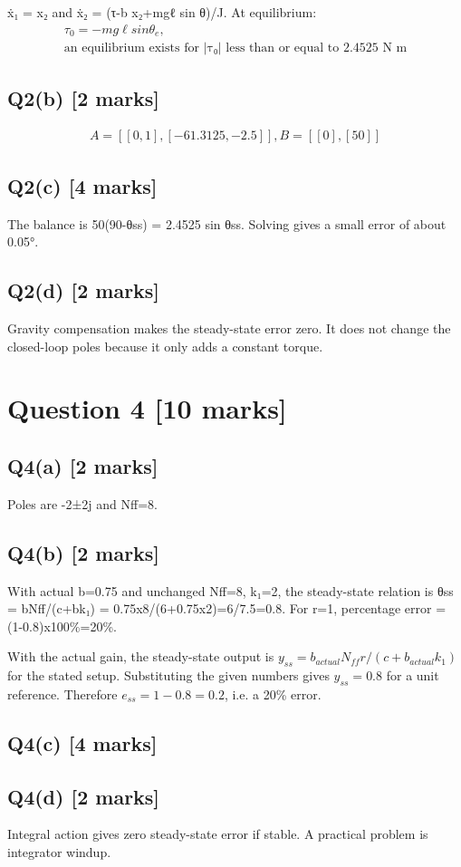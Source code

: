 \documentclass[11pt,a4paper]{article}
\begin{document}
ẋ₁ = x₂ and ẋ₂ = (τ-b x₂+mgℓ sin θ)/J.
At equilibrium:\[\begin{aligned}τ_0 = -mg\ell sin \theta_e,\\ \text{an equilibrium exists for |τ₀| less than or equal to 2.4525 N m}\end{aligned}\]

\subsection*{Q2(b) \hfill [2 marks]}

\[\begin{aligned}A = [[0,1], [-61.3125,-2.5]], B = [[0],[50]]\end{aligned}\]

\subsection*{Q2(c) \hfill [4 marks]}

The balance is 50(90-θss) = 2.4525 sin θss.
Solving gives a small error of about 0.05°.

\subsection*{Q2(d) \hfill [2 marks]}

Gravity compensation makes the steady-state error zero.
It does not change the closed-loop poles because it only adds a constant torque.

\section*{Question 4 \hfill [10 marks]}
\subsection*{Q4(a) \hfill [2 marks]}

Poles are -2±2j and Nff=8.

\subsection*{Q4(b) \hfill [2 marks]}

With actual b=0.75 and unchanged Nff=8, k₁=2, the steady-state relation is θss = bNff/(c+bk₁) = 0.75x8/(6+0.75x2)=6/7.5=0.8.
For r=1, percentage error = (1-0.8)x100\%=20\%.\par\smallskip With the actual gain, the steady-state output is $y_{ss}=b_{actual}N_{ff}r/ (c+b_{actual}k_1)$ for the stated setup. Substituting the given numbers gives $y_{ss}=0.8$ for a unit reference. Therefore $e_{ss}=1-0.8=0.2$, i.e. a 20\% error.

\subsection*{Q4(c) \hfill [4 marks]}

\vspace{2mm}

\subsection*{Q4(d) \hfill [2 marks]}

Integral action gives zero steady-state error if stable.
A practical problem is integrator windup.
\end{document}
